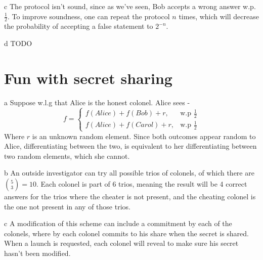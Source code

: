 \documentclass{article}
\begin{document}
\begin{paragraph}
    c The protocol isn't sound, since as we've seen, Bob accepts a wrong answer w.p. $\frac{1}{2}$.
    To improve soundness, one can repeat the protocol $n$ times, which will decrease the probability
    of accepting a false statement to $2^{-n}$.
\end{paragraph}

\begin{paragraph}
    d TODO
\end{paragraph}

\section{Fun with secret sharing}
\begin{paragraph}
    a Suppose w.l.g that Alice is the honest colonel. Alice sees - 
    \begin{equation*}
    f =
        \begin{cases}
            f(Alice) + f(Bob) + r, & \mbox{w.p } \frac{1}{2} \\
            f(Alice) + f(Carol) + r, & \mbox{w.p } \frac{1}{2}
        \end{cases}
    \end{equation*}
    Where $r$ is an unknown random element. Since both outcomes appear random to Alice,
    differentiating between the two, is equivalent to her differentiating between two random elements,
    which she cannot.
\end{paragraph}

\begin{paragraph}
    b An outside investigator can try all possible trios of colonels, of which there are
    $\binom{5}{3} = 10$. Each colonel is part of 6 trios, meaning the result will be 4 correct
    answers for the trios where the cheater is not present, and the cheating colonel is the one
    not present in any of those trios.
\end{paragraph}

\begin{paragraph}
    c A modification of this scheme can include a commitment by each of the colonels, where by
    each colonel commits to his share when the secret is shared. When a launch is requested,
    each colonel will reveal to make sure his secret hasn't been modified.
\end{paragraph}
\end{document}
